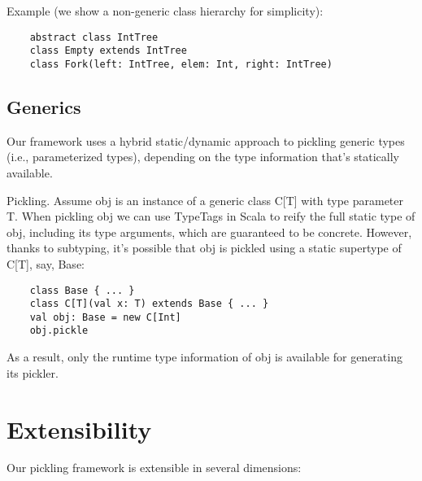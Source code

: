 \documentclass[preprint,10pt]{sigplanconf}
\begin{document}
Example (we show a non-generic class hierarchy for simplicity):

\begin{verbatim}
    abstract class IntTree
    class Empty extends IntTree
    class Fork(left: IntTree, elem: Int, right: IntTree)
\end{verbatim}

\subsection{Generics}

Our framework uses a hybrid static/dynamic approach to pickling generic types (i.e., parameterized types), depending on the type information that's statically available.

Pickling. Assume obj is an instance of a generic class C[T] with type parameter T. When pickling obj we can use TypeTags in Scala to reify the full static type of obj, including its type arguments, which are guaranteed to be concrete. However, thanks to subtyping, it's possible that obj is pickled using a static supertype of C[T], say, Base:

\begin{verbatim}
    class Base { ... }
    class C[T](val x: T) extends Base { ... }
    val obj: Base = new C[Int]
    obj.pickle
\end{verbatim}

As a result, only the runtime type information of obj is available for generating its pickler.



\section{Extensibility}

Our pickling framework is extensible in several dimensions:
\end{document}
